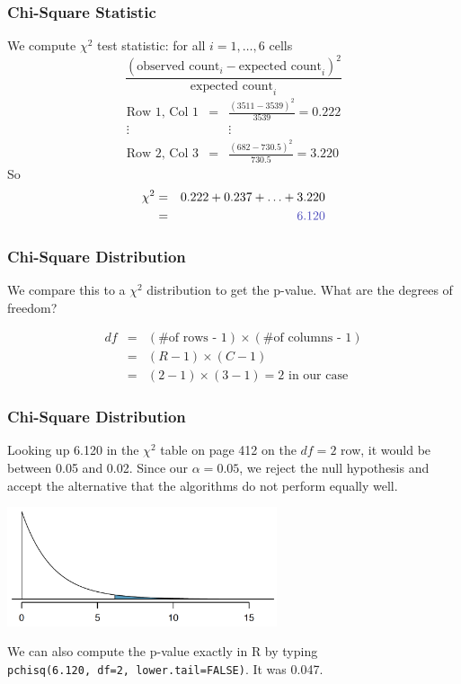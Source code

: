 \documentclass[slides]{beamer}
\newcommand{\blue}[1]{\textcolor{blue2}{#1}}
\begin{document}
\begin{frame}
\frametitle{Chi-Square Statistic}
We compute $\chi^2$ test statistic: for all $i = 1, \ldots, 6$ cells
\[
\frac{(\mbox{observed count}_i - \mbox{expected count}_i)^2}{\mbox{expected count}_i}
\]
\pause
\begin{eqnarray*}
\mbox{Row 1, Col 1} &=& \frac{(3511-3539)^2}{3539} = 0.222 \\
\vdots && \vdots\\
\mbox{Row 2, Col 3} &=& \frac{(682-730.5)^2}{730.5} = 3.220
\end{eqnarray*}
\pause So
\begin{eqnarray*}
\chi^2 &=& 0.222 + 0.237 + \ldots + 3.220\\
&=& \blue{6.120}
\end{eqnarray*}

\end{frame}


\begin{frame}
\frametitle{Chi-Square Distribution}
We compare this to a $\chi^2$ distribution to get the p-value.  What are the degrees of freedom?

\pause \begin{eqnarray*}
df &=& (\mbox{\# of rows - 1}) \times (\mbox{\# of columns - 1})\\
&=& (R-1) \times (C-1)\\
&=& (2-1) \times (3-1) = 2 \mbox{ in our case}
\end{eqnarray*}

\end{frame}


\begin{frame}
\frametitle{Chi-Square Distribution}
Looking up 6.120 in the $\chi^2$ table on page 412 on the $df=2$ row, it would be between 0.05 and 0.02.  Since our $\alpha=0.05$, we reject the null hypothesis and accept the alternative that the algorithms do not perform equally well.  

\begin{center}
\includegraphics[height=3.5cm]{figure/pvalue.png}
\end{center}

\pause
We can also compute the p-value exactly in R by typing\\
{\tt pchisq(6.120, df=2, lower.tail=FALSE)}.  It was 0.047.

\end{frame}
\end{document}
